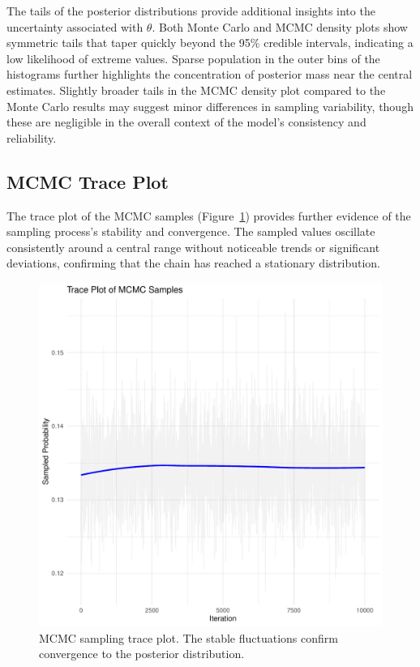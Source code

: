 \documentclass[12pt,a4paper]{article}
\begin{document}
The tails of the posterior distributions provide additional insights into the uncertainty associated with
$\theta$. Both Monte Carlo and MCMC density plots show symmetric tails that taper quickly beyond the 95\%
credible intervals, indicating a low likelihood of extreme values. Sparse population in the outer bins of
the histograms further highlights the concentration of posterior mass near the central estimates. Slightly
broader tails in the MCMC density plot compared to the Monte Carlo results may suggest minor differences in
sampling variability, though these are negligible in the overall context of the model's consistency and
reliability.

\subsection{MCMC Trace Plot}\label{ssec:traceplot}

The trace plot of the MCMC samples (Figure~\ref{fig:mcmctraceplot}) provides further evidence of the sampling
process's stability and convergence. The sampled values oscillate consistently around a central range without
noticeable trends or significant deviations, confirming that the chain has reached a stationary distribution.

\newpage

\begin{figure}[!ht]
    \centering
    \begin{minipage}[ht]{0.6\textwidth}
        \includegraphics[width=\textwidth]{figures/mcmc_trace_plot.pdf}
    \end{minipage}
    \hspace{0.02\textwidth}
    \begin{minipage}[ht]{0.35\textwidth}
        \caption{MCMC sampling trace plot. The stable fluctuations confirm convergence to the posterior distribution.}
        \label{fig:mcmctraceplot} %
    \end{minipage}
\end{figure}
\end{document}
